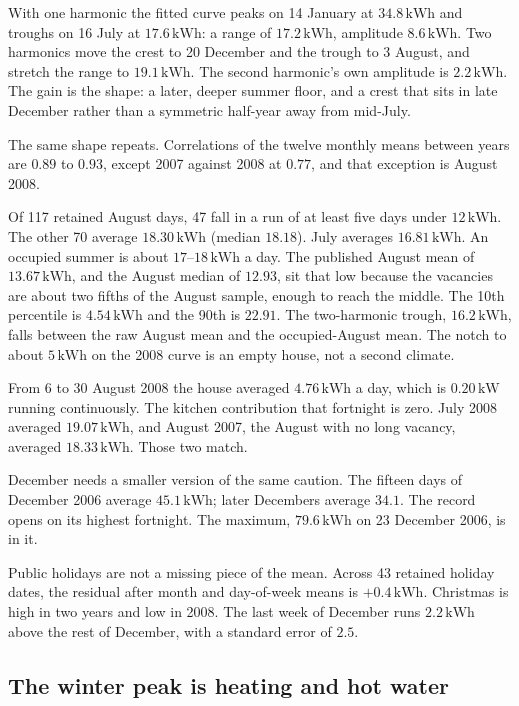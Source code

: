 \documentclass[11pt]{article}
\newcommand{\kwh}{\,\mathrm{kWh}}
\begin{document}
With one harmonic the fitted curve peaks on 14 January at $34.8\kwh$ and
troughs on 16 July at $17.6\kwh$: a range of $17.2\kwh$, amplitude $8.6\kwh$.
Two harmonics move the crest to 20 December and the trough to 3 August, and
stretch the range to $19.1\kwh$. The second harmonic's own amplitude is
$2.2\kwh$. The gain is the shape: a later, deeper summer floor, and a crest
that sits in late December rather than a symmetric half-year away from
mid-July.

The same shape repeats. Correlations of the twelve monthly means between years
are $0.89$ to $0.93$, except 2007 against 2008 at $0.77$, and that exception
is August 2008.

Of 117 retained August days, 47 fall in a run of at least five days under
$12\kwh$. The other 70 average $18.30\kwh$ (median $18.18$). July averages
$16.81\kwh$. An occupied summer is about $17$--$18\kwh$ a day. The published
August mean of $13.67\kwh$, and the August median of $12.93$, sit that low
because the vacancies are about two fifths of the August sample, enough to
reach the middle. The 10th percentile is $4.54\kwh$ and the 90th is $22.91$.
The two-harmonic trough, $16.2\kwh$, falls between the raw August mean and the
occupied-August mean. The notch to about $5\kwh$ on the 2008 curve is an empty
house, not a second climate.

From 6 to 30 August 2008 the house averaged $4.76\kwh$ a day, which is
$0.20\,\mathrm{kW}$ running continuously. The kitchen contribution that
fortnight is zero. July 2008 averaged $19.07\kwh$, and August 2007, the August
with no long vacancy, averaged $18.33\kwh$. Those two match.

December needs a smaller version of the same caution. The fifteen days of
December 2006 average $45.1\kwh$; later Decembers average $34.1$. The record
opens on its highest fortnight. The maximum, $79.6\kwh$ on 23 December 2006,
is in it.

Public holidays are not a missing piece of the mean. Across 43 retained
holiday dates, the residual after month and day-of-week means is
$+0.4\kwh$. Christmas is high in two years and low in 2008. The last week of
December runs $2.2\kwh$ above the rest of December, with a standard error of
$2.5$.

\subsection{The winter peak is heating and hot water}

\begin{center}
\small

\end{center}
\end{document}

